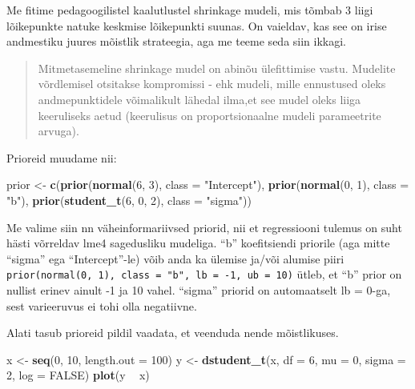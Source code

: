 \documentclass[]{book}
\newenvironment{Shaded}{\begin{snugshade}}{\end{snugshade}}
\newcommand{\DataTypeTok}[1]{\textcolor[rgb]{0.13,0.29,0.53}{#1}}
\newcommand{\DecValTok}[1]{\textcolor[rgb]{0.00,0.00,0.81}{#1}}
\newcommand{\KeywordTok}[1]{\textcolor[rgb]{0.13,0.29,0.53}{\textbf{#1}}}
\newcommand{\NormalTok}[1]{#1}
\newcommand{\OperatorTok}[1]{\textcolor[rgb]{0.81,0.36,0.00}{\textbf{#1}}}
\newcommand{\OtherTok}[1]{\textcolor[rgb]{0.56,0.35,0.01}{#1}}
\newcommand{\StringTok}[1]{\textcolor[rgb]{0.31,0.60,0.02}{#1}}
\begin{document}
Me fitime pedagoogilistel kaalutlustel shrinkage mudeli, mis tõmbab 3 liigi lõikepunkte natuke keskmise lõikepunkti suunas. On vaieldav, kas see on irise andmestiku juures mõistlik strateegia, aga me teeme seda siin ikkagi.

\begin{quote}
Mitmetasemeline shrinkage mudel on abinõu ülefittimise vastu. Mudelite võrdlemisel otsitakse kompromissi - ehk mudeli, mille ennustused oleks andmepunktidele võimalikult lähedal ilma,et see mudel oleks liiga keeruliseks aetud (keerulisus on proportsionaalne mudeli parameetrite arvuga).
\end{quote}

Prioreid muudame nii:

\begin{Shaded}
\begin{Highlighting}[]
\NormalTok{prior <-}\StringTok{ }\KeywordTok{c}\NormalTok{(}\KeywordTok{prior}\NormalTok{(}\KeywordTok{normal}\NormalTok{(}\DecValTok{6}\NormalTok{, }\DecValTok{3}\NormalTok{), }\DataTypeTok{class =} \StringTok{"Intercept"}\NormalTok{),}
           \KeywordTok{prior}\NormalTok{(}\KeywordTok{normal}\NormalTok{(}\DecValTok{0}\NormalTok{, }\DecValTok{1}\NormalTok{), }\DataTypeTok{class =} \StringTok{"b"}\NormalTok{),}
           \KeywordTok{prior}\NormalTok{(}\KeywordTok{student_t}\NormalTok{(}\DecValTok{6}\NormalTok{, }\DecValTok{0}\NormalTok{, }\DecValTok{2}\NormalTok{), }\DataTypeTok{class =} \StringTok{"sigma"}\NormalTok{))}
\end{Highlighting}
\end{Shaded}

Me valime siin nn väheinformariivsed priorid, nii et regressiooni tulemus on suht hästi võrreldav lme4 sagedusliku mudeliga. ``b'' koefitsiendi priorile (aga mitte ``sigma'' ega ``Intercept''-le) võib anda ka ülemise ja/või alumise piiri \texttt{prior(normal(0,\ 1),\ class\ =\ "b",\ lb\ =\ -1,\ ub\ =\ 10)} ütleb, et ``b'' prior on nullist erinev ainult -1 ja 10 vahel. ``sigma'' priorid on automaatselt lb = 0-ga, sest varieeruvus ei tohi olla negatiivne.

Alati tasub prioreid pildil vaadata, et veenduda nende mõistlikuses.

\begin{Shaded}
\begin{Highlighting}[]
\NormalTok{x <-}\StringTok{ }\KeywordTok{seq}\NormalTok{(}\DecValTok{0}\NormalTok{, }\DecValTok{10}\NormalTok{, }\DataTypeTok{length.out =} \DecValTok{100}\NormalTok{)}
\NormalTok{y <-}\StringTok{ }\KeywordTok{dstudent_t}\NormalTok{(x, }\DataTypeTok{df =} \DecValTok{6}\NormalTok{, }\DataTypeTok{mu =} \DecValTok{0}\NormalTok{, }\DataTypeTok{sigma =} \DecValTok{2}\NormalTok{, }\DataTypeTok{log =} \OtherTok{FALSE}\NormalTok{)}
\KeywordTok{plot}\NormalTok{(y }\OperatorTok{~}\StringTok{ }\NormalTok{x)}
\end{Highlighting}
\end{Shaded}
\end{document}
